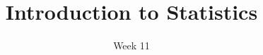 \title{Introduction to Statistics}
\date{Week 11}





\thispagestyle{plain}
\graphicspath{{lectures/week10/}}




